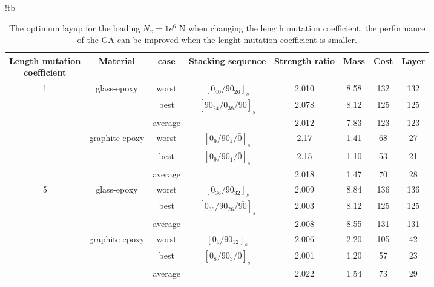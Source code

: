 \renewcommand{\arraystretch}{1.2}
\begin{table*}{!tb}
\caption{The optimum layup for the loading $N_x=1e^6$ N when changing the
length mutation coefficient, the performance of the GA can be improved
when the lenght mutation coefficient is smaller.} \centering
\begin{adjustbox}{width=1\textwidth}
	\begin{tabular}{cccccccc}
	\toprule
	\makecell{Length mutation \\ coefficient}		     &	 Material		               	 & case     & Stacking sequence    & Strength ratio  & Mass  &  Cost   & Layer    \\ 
	\midrule																															  
	\multirow{6}{*}{1} &	\multirow{3}{*}{glass-epoxy}   	 & worst     &  $[0_{40}/90_{26}]_s$ & 2.010           &  8.58  & 132     & 132   \\
					   &								     & best      &  $[90_{24}/0_{38}/\bar{90}]_s$ & 2.078  &  8.12  & 125     & 125  \\
					     &									 & average   &    		           & 2.012           &  7.83  & 123     & 123  \\
						 &	\multirow{3}{*}{graphite-epoxy}	 & worst     &  $[0_{9}/90_{4}/\bar{0}]_s$ & 2.17             & 1.41   & 68      & 27      \\
					     &								     & best      &  $[0_{9}/90_{1}/\bar{0}]_s$  & 2.15           & 1.10   & 53      & 21      \\
					     &								     & average   &                     & 2.018           & 1.47   & 70      & 28      \\ 
	\multirow{6}{*}{5} &	\multirow{3}{*}{glass-epoxy}   	 & worst     &  $[0_{36}/90_{32}]_s$ &  2.009          & 8.84   &  136    &  136   \\
					   &								     & best      &  $[0_{36}/90_{26}/\bar{90}]_s$ &  2.003          & 8.12   &  125    &  125   \\
					     &									 & average   &                     &  2.008          & 8.55   &  131    &  131  \\
						 &	\multirow{3}{*}{graphite-epoxy}	 & worst     &  $[0_{9}/90_{12}]_s$ &  2.006          & 2.20   &  105    &  42  \\
						 &								     & best      &  $[0_{8}/90_{3}/\bar{0}]_s$  &  2.001          & 1.20   &  57     &  23  \\
					     &								     & average   &                    &   2.022          & 1.54   &  73     &  29  \\
	\bottomrule																															  
\end{tabular}
\end{adjustbox}
\label{tab:optimum_layup}
\end{table*}
            
            
